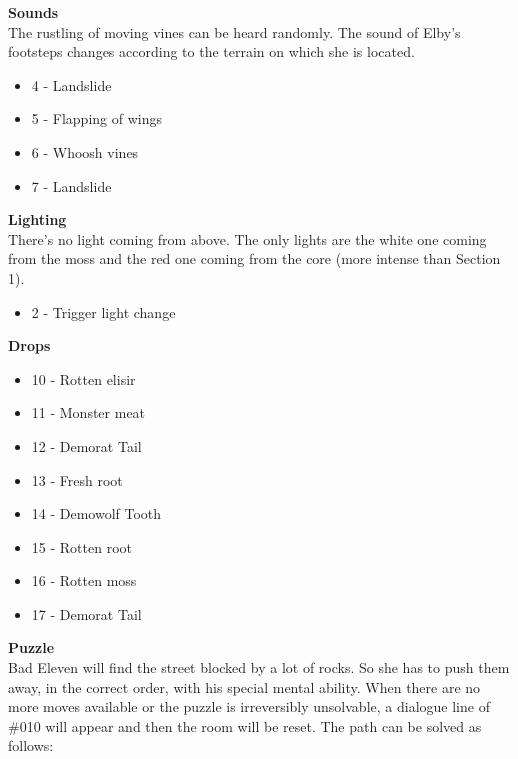 \textbf{Sounds}\\
The rustling of moving vines can be heard randomly. The sound of Elby's footsteps changes according to the terrain on which she is located.

\begin{itemize}
	\item 4 - Landslide
	\item 5 - Flapping of wings
	\item 6 - Whoosh vines
	\item 7 - Landslide
\end{itemize}

\textbf{Lighting}\\
There's no light coming from above. The only lights are the white one coming from the moss and the red one coming from the core (more intense than Section 1).

\begin{itemize}
	\item 2 - Trigger light change
\end{itemize}

\newpage

\textbf{Drops}
\begin{itemize}
	\item 10 - Rotten elisir
	\item 11 - Monster meat
	\item 12 - Demorat Tail
	\item 13 - Fresh root
	\item 14 - Demowolf Tooth
	\item 15 - Rotten root
	\item 16 - Rotten moss
	\item 17 - Demorat Tail
\end{itemize}

\textbf{Puzzle}\\
Bad Eleven will find the street blocked by a lot of rocks. So she has to push them away, in the correct order, with his special mental ability. When there are no more moves available or the puzzle is irreversibly unsolvable, a dialogue line of \#010 will appear and then the room will be reset.
The path can be solved as follows:\\

